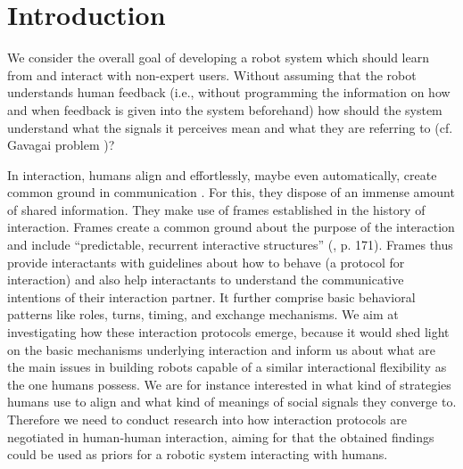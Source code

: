 \section{Introduction}


We consider the overall goal of developing a robot system which should learn from and interact with non-expert users. Without assuming that the robot understands human feedback (i.e., without programming the information on how and when feedback is given into the system beforehand) how should the system understand what the signals it perceives mean and what they are referring to (cf. Gavagai problem \cite{quine1964word})?

In interaction, humans align and effortlessly, maybe even automatically, create common ground in communication \cite{clark1991grounding,pickering2004toward}. For this, they dispose of an immense amount of shared information. They make use of frames established in the history of interaction. Frames create a common ground about the purpose of the interaction \cite{tomasello2009cultural,rohlfing2013learning} and include ``predictable, recurrent interactive structures'' (\cite{ninio1996pragmatic}, p. 171). Frames thus provide interactants with guidelines about how to behave (a protocol for interaction) and also help interactants to understand the communicative intentions of their interaction partner. It further comprise basic behavioral patterns like roles, turns, timing, and exchange mechanisms. We aim at investigating how these interaction protocols emerge, because it would shed light on the basic mechanisms underlying interaction and inform us about what are the main issues in building robots capable of a similar interactional flexibility as the one humans possess. We are for instance interested in what kind of strategies humans use to align and what kind of meanings of social signals they converge to. Therefore we need to conduct research into how interaction protocols are negotiated in human-human interaction, aiming for that the obtained findings could be used as priors for a robotic system interacting with humans.

